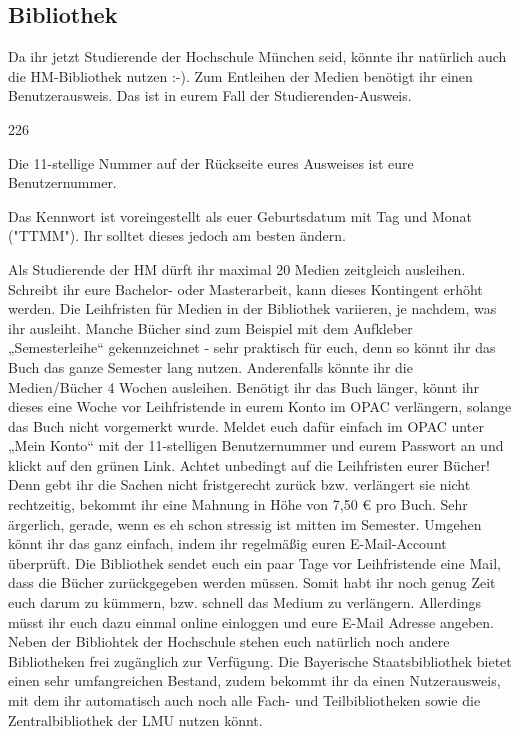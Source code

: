 \subsection{Bibliothek}
Da ihr jetzt Studierende der Hochschule München seid, könnte ihr 
natürlich auch die HM-Bibliothek nutzen :-).
Zum Entleihen der Medien benötigt ihr einen Benutzerausweis. Das ist 
in eurem Fall der Studierenden-Ausweis.
\begin{dinglist}{226}
\item Die 11-stellige Nummer auf der Rückseite eures Ausweises ist eure 
Benutzernummer. 
\item Das Kennwort ist voreingestellt als euer Geburtsdatum mit Tag und 
Monat ("TTMM"). Ihr solltet dieses jedoch am besten ändern. 
\end{dinglist}
Als Studierende der HM dürft ihr maximal 20 Medien zeitgleich 
ausleihen. Schreibt ihr eure Bachelor- oder Masterarbeit, kann dieses 
Kontingent erhöht werden. Die Leihfristen für Medien in der Bibliothek 
variieren, je nachdem, was ihr ausleiht. Manche Bücher sind zum 
Beispiel mit dem Aufkleber „Semesterleihe“ gekennzeichnet - sehr 
praktisch für euch, denn so könnt ihr das Buch das ganze Semester 
lang nutzen. Anderenfalls könnte ihr die Medien/Bücher 4 Wochen 
ausleihen. Benötigt ihr das Buch länger, könnt ihr dieses eine Woche 
vor Leihfristende in eurem Konto im OPAC verlängern, solange das 
Buch nicht vorgemerkt wurde. Meldet euch dafür einfach im OPAC 
unter „Mein Konto“ mit der 11-stelligen Benutzernummer und eurem 
Passwort an und klickt auf den grünen Link. 
Achtet unbedingt auf die Leihfristen eurer Bücher! Denn gebt ihr die 
Sachen nicht fristgerecht zurück bzw. verlängert sie nicht rechtzeitig, 
bekommt ihr eine Mahnung in Höhe von 7,50 € pro Buch. Sehr ärgerlich, 
gerade, wenn es eh schon stressig ist mitten im Semester. 
Umgehen könnt ihr das ganz einfach, indem ihr regelmäßig euren 
E-Mail-Account überprüft. Die Bibliothek sendet euch ein paar Tage 
vor Leihfristende eine Mail, dass die Bücher zurückgegeben werden 
müssen. Somit habt ihr noch genug Zeit euch darum zu kümmern, 
bzw. schnell das Medium zu verlängern. Allerdings müsst ihr euch dazu 
einmal online einloggen und eure E-Mail Adresse angeben.
Neben der Bibliohtek der Hochschule stehen euch natürlich noch 
andere Bibliotheken frei zugänglich zur Verfügung. Die Bayerische 
Staatsbibliothek bietet einen sehr umfangreichen Bestand, zudem 
bekommt ihr da einen Nutzerausweis, mit dem ihr automatisch auch 
noch alle Fach- und Teilbibliotheken sowie die 
Zentralbibliothek der LMU nutzen könnt.